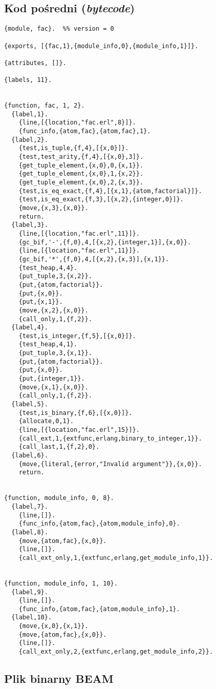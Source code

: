 \subsection{Kod pośredni (\emph{bytecode})}
\begin{lstlisting}[style=erlang, caption=\emph{Bytecode} modułu fac, label=facS]
{module, fac}.  %% version = 0

{exports, [{fac,1},{module_info,0},{module_info,1}]}.

{attributes, []}.

{labels, 11}.


{function, fac, 1, 2}.
  {label,1}.
    {line,[{location,"fac.erl",8}]}.
    {func_info,{atom,fac},{atom,fac},1}.
  {label,2}.
    {test,is_tuple,{f,4},[{x,0}]}.
    {test,test_arity,{f,4},[{x,0},3]}.
    {get_tuple_element,{x,0},0,{x,1}}.
    {get_tuple_element,{x,0},1,{x,2}}.
    {get_tuple_element,{x,0},2,{x,3}}.
    {test,is_eq_exact,{f,4},[{x,1},{atom,factorial}]}.
    {test,is_eq_exact,{f,3},[{x,2},{integer,0}]}.
    {move,{x,3},{x,0}}.
    return.
  {label,3}.
    {line,[{location,"fac.erl",11}]}.
    {gc_bif,'-',{f,0},4,[{x,2},{integer,1}],{x,0}}.
    {line,[{location,"fac.erl",11}]}.
    {gc_bif,'*',{f,0},4,[{x,2},{x,3}],{x,1}}.
    {test_heap,4,4}.
    {put_tuple,3,{x,2}}.
    {put,{atom,factorial}}.
    {put,{x,0}}.
    {put,{x,1}}.
    {move,{x,2},{x,0}}.
    {call_only,1,{f,2}}.
  {label,4}.
    {test,is_integer,{f,5},[{x,0}]}.
    {test_heap,4,1}.
    {put_tuple,3,{x,1}}.
    {put,{atom,factorial}}.
    {put,{x,0}}.
    {put,{integer,1}}.
    {move,{x,1},{x,0}}.
    {call_only,1,{f,2}}.
  {label,5}.
    {test,is_binary,{f,6},[{x,0}]}.
    {allocate,0,1}.
    {line,[{location,"fac.erl",15}]}.
    {call_ext,1,{extfunc,erlang,binary_to_integer,1}}.
    {call_last,1,{f,2},0}.
  {label,6}.
    {move,{literal,{error,"Invalid argument"}},{x,0}}.
    return.


{function, module_info, 0, 8}.
  {label,7}.
    {line,[]}.
    {func_info,{atom,fac},{atom,module_info},0}.
  {label,8}.
    {move,{atom,fac},{x,0}}.
    {line,[]}.
    {call_ext_only,1,{extfunc,erlang,get_module_info,1}}.


{function, module_info, 1, 10}.
  {label,9}.
    {line,[]}.
    {func_info,{atom,fac},{atom,module_info},1}.
  {label,10}.
    {move,{x,0},{x,1}}.
    {move,{atom,fac},{x,0}}.
    {line,[]}.
    {call_ext_only,2,{extfunc,erlang,get_module_info,2}}.
\end{lstlisting}
\subsection{Plik binarny BEAM}

